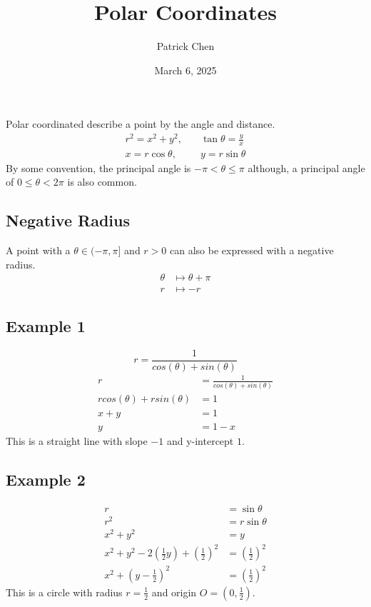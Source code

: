 \documentclass{article}
\title{Polar Coordinates}
\author{Patrick Chen}
\date{March 6, 2025}
\theoremstyle{mytheoremstyle}
\theoremstyle{mytheoremstyle}
\theoremstyle{myproblemstyle}
\begin{document}
    \maketitle
    Polar coordinated describe a point by the angle and distance.
    \begin{align*}
        r^2 = x^2 + y^2, &\quad \tan\theta = \frac{y}{x} \\
        x=r\cos\theta, &\quad y=r\sin\theta
    \end{align*}
    By some convention, the principal angle is $-\pi< \theta \le \pi$ although,
    a principal angle of $0 \le \theta < 2\pi$ is also common.

    \subsection*{Negative Radius}
    A point with a $\theta \in (-\pi, \pi]$ and $r > 0$ can also be expressed
    with a negative radius.
    \begin{align*}
        \theta &\mapsto \theta + \pi \\
        r      &\mapsto -r
    \end{align*}

    \subsection*{Example 1}
    \[
        r = \frac{1}{cos(\theta) + sin(\theta)}
    \]
    \begin{align*}
        r &= \frac{1}{cos(\theta) + sin(\theta)} \\
        rcos(\theta) + rsin(\theta) &= 1 \\
        x + y &= 1 \\
        y &= 1-x
    \end{align*}
    This is a straight line with slope $-1$ and y-intercept $1$.

    \subsection*{Example 2}
    \begin{align*}
        r &= \sin \theta \\
        r^2 &= r \sin \theta \\
        x^2 + y^2 &= y \\
        x^2 + y^2 - 2(\frac{1}{2} y) + (\frac{1}{2})^2 &= (\frac{1}{2})^2 \\
        x^2 + (y-\frac{1}{2})^2 &= (\frac{1}{2})^2
    \end{align*}
    This is a circle with radius $r=\frac{1}{2}$ and origin $O=(0, \frac{1}{2})$.
\end{document}
